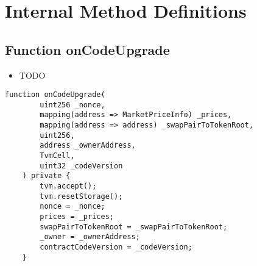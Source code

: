 \section{Internal Method Definitions}


\subsection{Function onCodeUpgrade}

\noindent\begin{itemize}
\item TODO
\end{itemize}

\begin{lstlisting}[firstnumber=79]
    function onCodeUpgrade(
        uint256 _nonce,
        mapping(address => MarketPriceInfo) _prices,
        mapping(address => address) _swapPairToTokenRoot,
        uint256,
        address _ownerAddress,
        TvmCell,
        uint32 _codeVersion
    ) private {
        tvm.accept();
        tvm.resetStorage();
        nonce = _nonce;
        prices = _prices;
        swapPairToTokenRoot = _swapPairToTokenRoot;
        _owner = _ownerAddress;
        contractCodeVersion = _codeVersion;
    }
\end{lstlisting}
